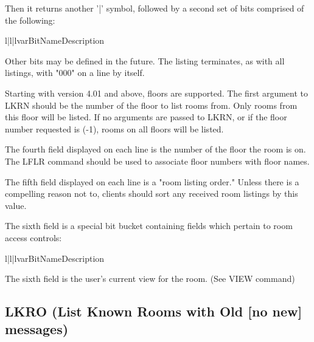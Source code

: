  Then it returns another '|' symbol, followed by a second set of bits comprised
of the following:

\begin{tableiii}{l|l|l}{var}{Bit}{Name}{Description}



\end{tableiii}



 Other bits may be defined in the future.  The listing terminates, as with
all listings, with "000" on a line by itself.

 Starting with version 4.01 and above, floors are supported.  The first
argument to LKRN should be the number of the floor to list rooms from.  Only
rooms from this floor will be listed.  If no arguments are passed to LKRN, or
if the floor number requested is (-1), rooms on all floors will be listed.

 The fourth field displayed on each line is the number of the floor the room
is on.  The LFLR command should be used to associate floor numbers with
floor names.

 The fifth field displayed on each line is a "room listing order."  Unless
there is a compelling reason not to, clients should sort any received room
listings by this value.

 The sixth field is a special bit bucket containing fields which pertain to
room access controls:

\begin{tableiii}{l|l|l}{var}{Bit}{Name}{Description}





\end{tableiii}


 The sixth field is the user's current view for the room. (See VIEW command)



\subsection{LKRO (List Known Rooms with Old [no new] messages)}

